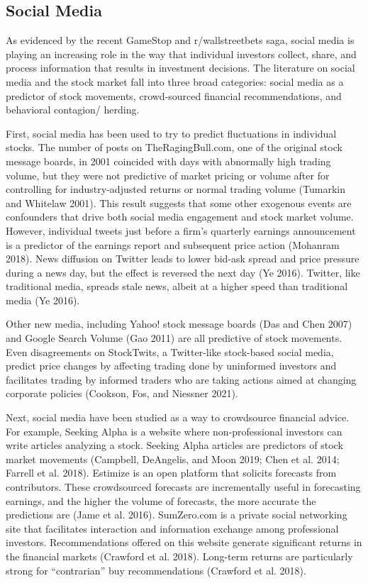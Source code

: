 \documentclass[12pt,]{article}
\begin{document}
\hypertarget{social-media}{%
\subsection{Social Media}\label{social-media}}

As evidenced by the recent GameStop and r/wallstreetbets saga, social
media is playing an increasing role in the way that individual investors
collect, share, and process information that results in investment
decisions. The literature on social media and the stock market fall into
three broad categories: social media as a predictor of stock movements,
crowd-sourced financial recommendations, and behavioral contagion/
herding.

First, social media has been used to try to predict fluctuations in
individual stocks. The number of posts on TheRagingBull.com, one of the
original stock message boards, in 2001 coincided with days with
abnormally high trading volume, but they were not predictive of market
pricing or volume after for controlling for industry-adjusted returns or
normal trading volume (Tumarkin and Whitelaw 2001). This result suggests
that some other exogenous events are confounders that drive both social
media engagement and stock market volume. However, individual tweets
just before a firm's quarterly earnings announcement is a predictor of
the earnings report and subsequent price action (Mohanram 2018). News
diffusion on Twitter leads to lower bid-ask spread and price pressure
during a news day, but the effect is reversed the next day (Ye 2016).
Twitter, like traditional media, spreads stale news, albeit at a higher
speed than traditional media (Ye 2016).

Other new media, including Yahoo! stock message boards (Das and Chen
2007) and Google Search Volume (Gao 2011) are all predictive of stock
movements. Even disagreements on StockTwits, a Twitter-like stock-based
social media, predict price changes by affecting trading done by
uninformed investors and facilitates trading by informed traders who are
taking actions aimed at changing corporate policies (Cookson, Fos, and
Niessner 2021).

Next, social media have been studied as a way to crowdsource financial
advice. For example, Seeking Alpha is a website where non-professional
investors can write articles analyzing a stock. Seeking Alpha articles
are predictors of stock market movements (Campbell, DeAngelis, and Moon
2019; Chen et al. 2014; Farrell et al. 2018). Estimize is an open
platform that solicits forecasts from contributors. These crowdsourced
forecasts are incrementally useful in forecasting earnings, and the
higher the volume of forecasts, the more accurate the predictions are
(Jame et al. 2016). SumZero.com is a private social networking site that
facilitates interaction and information exchange among professional
investors. Recommendations offered on this website generate significant
returns in the financial markets (Crawford et al. 2018). Long-term
returns are particularly strong for ``contrarian'' buy recommendations
(Crawford et al. 2018).
\end{document}
